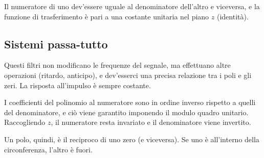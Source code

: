 Il numeratore di uno dev'essere uguale al denominatore dell'altro e viceversa, e la funzione di trasferimento è pari a una costante unitaria nel piano $z$ (identità).

\subsection{Sistemi passa-tutto}
Questi filtri non modificano le frequenze del segnale, ma effettuano altre operazioni (ritardo, anticipo), e dev'esserci una precisa relazione tra i poli e gli zeri. La risposta all'impulso è sempre costante.

I coefficienti del polinomio al numeratore sono in ordine inverso rispetto a quelli del denominatore, e ciò viene garantito imponendo il modulo quadro unitario. Raccogliendo $z$, il numeratore resta invariato e il denominatore viene invertito. 

Un polo, quindi, è il reciproco di uno zero (e viceversa). Se uno è all'interno della circonferenza, l'altro è fuori.



